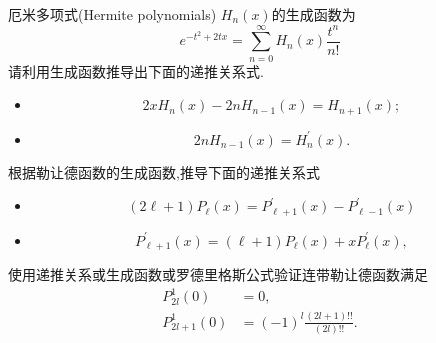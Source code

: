 \documentclass[10pt]{article}
\newenvironment{problem}[2][]{\begin{trivlist}
\item[\hskip \labelsep {\bfseries #1}\hskip \labelsep {\bfseries #2}]}{\end{trivlist}}
\begin{document}
\renewcommand{\labelenumi}{(\arabic{enumi})}
\renewcommand{\labelenumii}{(\arabic{enumi}.\arabic{enumii})}



 




\begin{problem}{9.1}
厄米多项式(Hermite polynomials) $H_n(x)$的生成函数为
$$
e^{-t^2+2 t x}=\sum_{n=0}^{\infty} H_n(x) \frac{t^n}{n !}
$$
请利用生成函数推导出下面的递推关系式.
\begin{itemize}
  \item[(1)] $$
  2 x H_n(x)-2 n H_{n-1}(x)=H_{n+1}(x);
  $$
  \item[(2)] $$2 n H_{n-1}(x)=H_n^{\prime}(x) . $$
\end{itemize}
\end{problem}



\begin{problem}{9.2}
根据勒让德函数的生成函数,推导下面的递推关系式
\begin{itemize}
  \item[(1)] $$
  (2 \ell+1) P_\ell(x)=P_{\ell+1}^{\prime}(x)-P_{\ell-1}^{\prime}(x)
  $$
  \item[(2)]
  $$
  P_{\ell+1}^{\prime}(x)=(\ell+1) P_\ell(x)+x P_\ell^{\prime}(x),
  $$
\end{itemize}
\end{problem}
  



\begin{problem}{9.3}
  使用递推关系或生成函数或罗德里格斯公式验证连带勒让德函数满足
  $$
  \begin{aligned}
  P_{2 l}^1(0) & =0, \\
  P_{2 l+1}^1(0) & =(-1)^{l} \frac{(2 l+1) ! !}{(2 l) ! !}.
  \end{aligned}
  $$
\end{problem}
\end{document}
